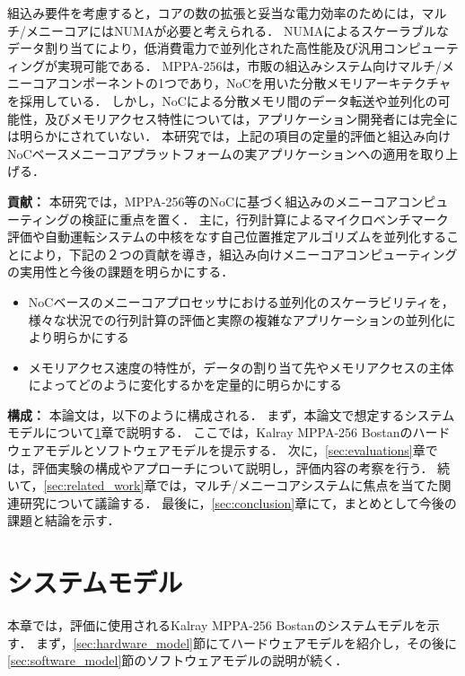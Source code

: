 \documentclass[submit,techrep]{ipsj_v2/UTF8/ipsj}
\begin{document}
組込み要件を考慮すると，コアの数の拡張と妥当な電力効率のためには，マルチ/メニーコアにはNUMAが必要と考えられる．
NUMAによるスケーラブルなデータ割り当てにより，低消費電力で並列化された高性能及び汎用コンピューティングが実現可能である．
MPPA-256は，市販の組込みシステム向けマルチ/メニーコアコンポーネントの1つであり，NoCを用いた分散メモリアーキテクチャを採用している． 
しかし，NoCによる分散メモリ間のデータ転送や並列化の可能性，及びメモリアクセス特性については，アプリケーション開発者には完全には明らかにされていない．
本研究では，上記の項目の定量的評価と組込み向けNoCベースメニーコアプラットフォームの実アプリケーションへの適用を取り上げる．

\textbf{貢献：}
本研究では，MPPA-256等のNoCに基づく組込みのメニーコアコンピューティングの検証に重点を置く．
主に，行列計算によるマイクロベンチマーク評価や自動運転システムの中核をなす自己位置推定アルゴリズムを並列化することにより，下記の２つの貢献を導き，組込み向けメニーコアコンピューティングの実用性と今後の課題を明らかにする．

\begin{itemize}
\item NoCベースのメニーコアプロセッサにおける並列化のスケーラビリティを，様々な状況での行列計算の評価と実際の複雑なアプリケーションの並列化により明らかにする
\item メモリアクセス速度の特性が，データの割り当て先やメモリアクセスの主体によってどのように変化するかを定量的に明らかにする
\end{itemize}


\textbf{構成：}
本論文は，以下のように構成される．
まず，本論文で想定するシステムモデルについて\ref{sec:system_model}章で説明する．
ここでは，Kalray MPPA-256 Bostanのハードウェアモデルとソフトウェアモデルを提示する．
次に，\ref{sec:evaluations}章では，評価実験の構成やアプローチについて説明し，評価内容の考察を行う．
続いて，\ref{sec:related_work}章では，マルチ/メニーコアシステムに焦点を当てた関連研究について議論する．
最後に，\ref{sec:conclusion}章にて，まとめとして今後の課題と結論を示す．

\section{システムモデル}
\label{sec:system_model}
本章では，評価に使用されるKalray MPPA-256 Bostanのシステムモデルを示す．
まず，\ref{sec:hardware_model}節にてハードウェアモデルを紹介し，その後に\ref{sec:software_model}節のソフトウェアモデルの説明が続く．
\end{document}
